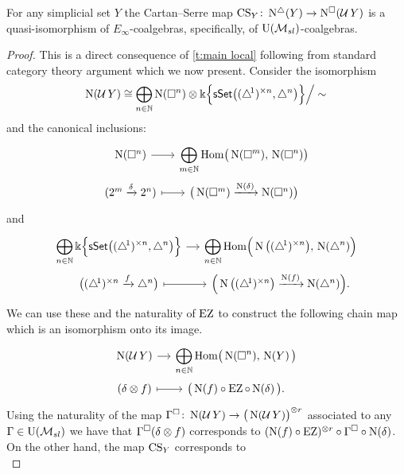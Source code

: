 \begin{theorem} \label{t:main comparison}
	For any simplicial set $Y$ the Cartan--Serre map $\CS_Y \colon \schains(Y) \to \cchains(\cubify Y)$ is a quasi-isomorphism of $E_\infty$-coalgebras, specifically, of $\USL$-coalgebras.
\end{theorem}

\begin{proof}
	This is a direct consequence of \cref{t:main local} following from standard category theory argument which we now present.
	Consider the isomorphism
	\[
	\chains(\cubify Y) \cong \displaystyle\bigoplus_{n\in\N} \chains(\cube^n) \ot \k\set[\Big]{\sSet \big( \scube{n}, \simplex^n \big)} \Big/ \sim \,
	\]
	and the canonical inclusions:
	\[
	\begin{tikzcd} [row sep=0, column sep=small]
		\chains(\cube^n) \arrow[r] &
		\displaystyle\bigoplus_{m \in \N} \Hom \big( \chains(\cube^m),\, \chains(\cube^n) \big) \\
		(2^m \xra{\delta} 2^n) \arrow[r, mapsto] &
		\big(\chains(\cube^m) \xra{\chains(\delta)} \chains(\cube^n)\big)
	\end{tikzcd}
	\]
	and
	\[
	\begin{tikzcd} [row sep=0, column sep=small]
		\displaystyle \bigoplus_{n \in \N}
		\k\set[\Big]{\sSet\big(\scube{n}, \simplex^n\big)} \arrow[r] &
		\displaystyle \bigoplus_{n \in \N}
		\Hom \Big( \chains \big( \scube{n} \big),\, \chains(\simplex^n) \Big) \\
		\big( \scube{n} \xra{f} \simplex^n \big) \arrow[r, mapsto] &
		\Big( \chains \big( \scube{n} \big) \xra{\chains(f)} \chains(\simplex^n) \Big).
	\end{tikzcd}
	\]
	We can use these and the naturality of $\EZ$ to construct the following chain map which is an isomorphism onto its image.
	\[
	\begin{tikzcd}[column sep=small, row sep=0]
		\chains(\cubify Y) \arrow[r] &
		\displaystyle\bigoplus_{n\in\N} \Hom \big( \chains(\cube^n),\, \chains(Y)\, \big) \\
		(\delta \ot f) \arrow[r, mapsto]& \big( \chains(f) \circ \EZ \circ \chains(\delta) \, \big).
	\end{tikzcd}
	\]
	Using the naturality of the map $\Gamma^\square \colon \chains(\cubify Y) \to \big( \chains(\cubify Y) \big)^{\ot r}$ associated to any $\Gamma \in \USL$ we have that
	$\Gamma^\square(\delta \ot f)$ corresponds to $(\chains(f) \circ \EZ)^{\ot r} \circ \Gamma^\square \circ \chains(\delta)$.
	On the other hand, the map $\CS_Y$ corresponds to
	\[
\]
\end{proof}
